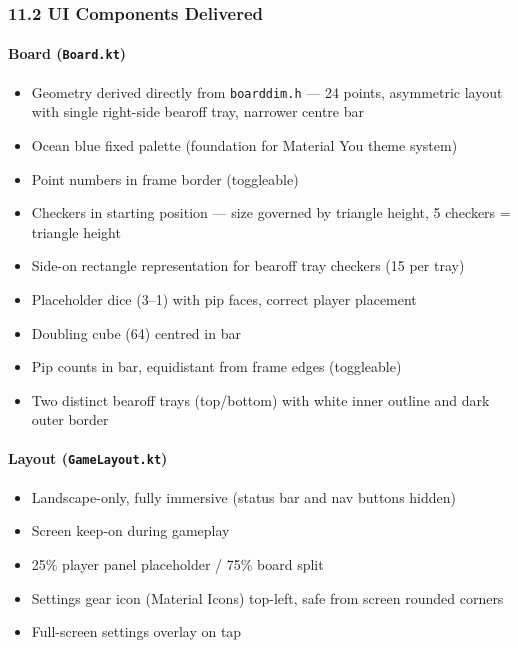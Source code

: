 \documentclass[11pt,a4paper]{article}
\providecommand{\tightlist}{\setlength{\itemsep}{2pt}\setlength{\parskip}{0pt}}
\begin{document}
\subsubsection{11.2 UI Components
Delivered}\label{ui-components-delivered}

\paragraph{Board (\texttt{Board.kt})}\label{boardkt}

\begin{itemize}
\tightlist
\item
  Geometry derived directly from \texttt{boarddim.h} --- 24 points,
  asymmetric layout with single right-side bearoff tray, narrower
  centre bar
\item
  Ocean blue fixed palette (foundation for Material You theme system)
\item
  Point numbers in frame border (toggleable)
\item
  Checkers in starting position --- size governed by triangle height,
  5 checkers = triangle height
\item
  Side-on rectangle representation for bearoff tray checkers (15 per
  tray)
\item
  Placeholder dice (3--1) with pip faces, correct player placement
\item
  Doubling cube (64) centred in bar
\item
  Pip counts in bar, equidistant from frame edges (toggleable)
\item
  Two distinct bearoff trays (top/bottom) with white inner outline and
  dark outer border
\end{itemize}

\paragraph{Layout (\texttt{GameLayout.kt})}\label{gamelayoutkt}

\begin{itemize}
\tightlist
\item
  Landscape-only, fully immersive (status bar and nav buttons hidden)
\item
  Screen keep-on during gameplay
\item
  25\% player panel placeholder / 75\% board split
\item
  Settings gear icon (Material Icons) top-left, safe from screen
  rounded corners
\item
  Full-screen settings overlay on tap
\end{itemize}
\end{document}
